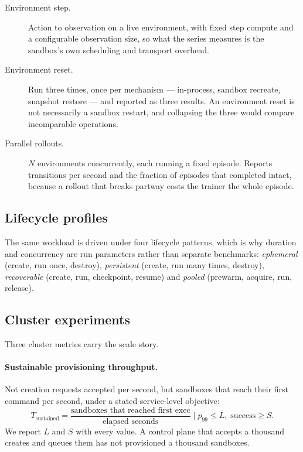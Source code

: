 \begin{description}
  \item[Environment step.] Action to observation on a live environment, with
  fixed step compute and a configurable observation size, so what the series
  measures is the sandbox's own scheduling and transport overhead.
  \item[Environment reset.] Run three times, once per mechanism ---
  in-process, sandbox recreate, snapshot restore --- and reported as three
  results. An environment reset is not necessarily a sandbox restart, and
  collapsing the three would compare incomparable operations.
  \item[Parallel rollouts.] $N$ environments concurrently, each running a
  fixed episode. Reports transitions per second and the fraction of episodes
  that completed intact, because a rollout that breaks partway costs the
  trainer the whole episode.
\end{description}

\subsection{Lifecycle profiles}

The same workload is driven under four lifecycle patterns, which is why
duration and concurrency are run parameters rather than separate benchmarks:
\emph{ephemeral} (create, run once, destroy), \emph{persistent} (create, run
many times, destroy), \emph{recoverable} (create, run, checkpoint, resume) and
\emph{pooled} (prewarm, acquire, run, release).

\subsection{Cluster experiments}
\label{sec:design:cluster}

Three cluster metrics carry the scale story.

\paragraph{Sustainable provisioning throughput.} Not creation requests
accepted per second, but sandboxes that reach their first command per second,
under a stated service-level objective:
\[
  T_{\mathrm{sustained}} =
  \frac{\text{sandboxes that reached first exec}}{\text{elapsed seconds}}
  \;\Big|\; p_{99} \le L,\; \text{success} \ge S.
\]
We report $L$ and $S$ with every value. A control plane that accepts a
thousand creates and queues them has not provisioned a thousand sandboxes.

